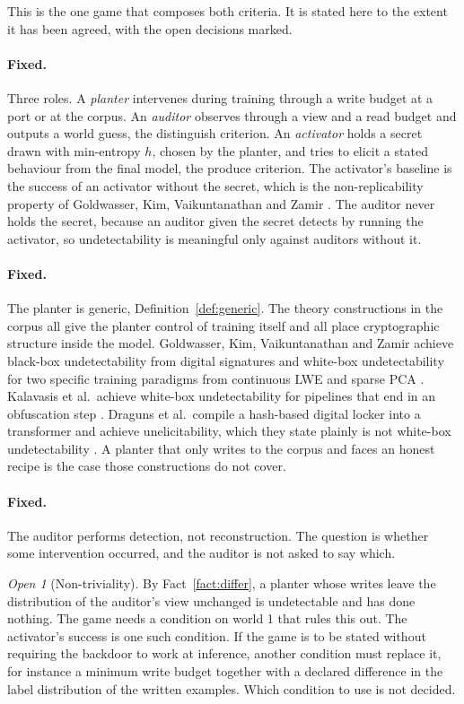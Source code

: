 \documentclass[11pt]{article}
\theoremstyle{definition}
\theoremstyle{plain}
\theoremstyle{remark}
\newtheorem{openq}{Open}
\begin{document}
This is the one game that composes both criteria. It is stated here to the extent
it has been agreed, with the open decisions marked.

\paragraph{Fixed.} Three roles. A \emph{planter} intervenes during training
through a write budget at a port or at the corpus. An \emph{auditor} observes
through a view and a read budget and outputs a world guess, the distinguish
criterion. An \emph{activator} holds a secret drawn with min-entropy $h$, chosen
by the planter, and tries to elicit a stated behaviour from the final model, the
produce criterion. The activator's baseline is the success of an activator without
the secret, which is the non-replicability property of Goldwasser, Kim,
Vaikuntanathan and Zamir \cite{GKVZ22}. The auditor never holds the secret,
because an auditor given the secret detects by running the activator, so
undetectability is meaningful only against auditors without it.

\paragraph{Fixed.} The planter is generic, Definition~\ref{def:generic}. The
theory constructions in the corpus all give the planter control of training
itself and all place cryptographic structure inside the model. Goldwasser, Kim,
Vaikuntanathan and Zamir achieve black-box undetectability from digital
signatures and white-box undetectability for two specific training paradigms
from continuous LWE and sparse PCA \cite{GKVZ22}. Kalavasis et al.\ achieve
white-box undetectability for pipelines that end in an obfuscation step
\cite{KKOSVZ24}. Draguns et al.\ compile a hash-based digital locker into a
transformer and achieve unelicitability, which they state plainly is not
white-box undetectability \cite{DGMRLW24}. A planter that only writes to the
corpus and faces an honest recipe is the case those constructions do not cover.

\paragraph{Fixed.} The auditor performs detection, not reconstruction. The
question is whether some intervention occurred, and the auditor is not asked to
say which.

\begin{openq}[Non-triviality]
\label{oq:nontrivial}
By Fact~\ref{fact:differ}, a planter whose writes leave the distribution of the
auditor's view unchanged is undetectable and has done nothing. The game needs a
condition on world 1 that rules this out. The activator's success is one such
condition. If the game is to be stated without requiring the backdoor to work at
inference, another condition must replace it, for instance a minimum write budget
together with a declared difference in the label distribution of the written
examples. Which condition to use is not decided.
\end{openq}
\end{document}

